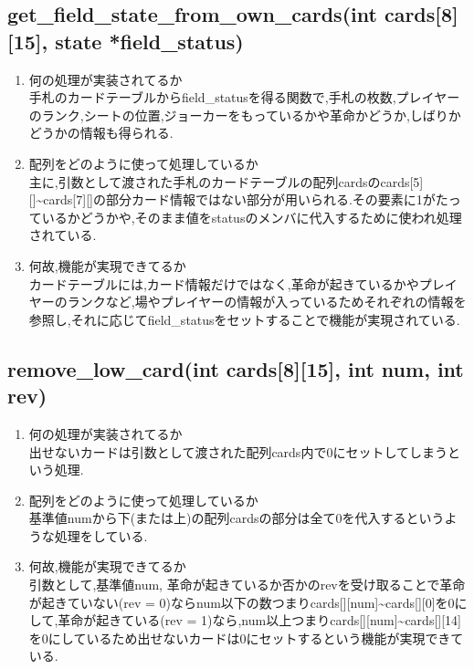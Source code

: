 \documentclass{jsarticle}
\begin{document}
\subsection{get\_field\_state\_from\_own\_cards(int cards[8][15], state *field\_status)}
\begin{enumerate}
  \item  何の処理が実装されてるか\\
  手札のカードテーブルからfield\_statusを得る関数で,手札の枚数,プレイヤーのランク,シートの位置,ジョーカーをもっているかや革命かどうか,しばりかどうかの情報も得られる.
  \item 配列をどのように使って処理しているか\\
  主に,引数として渡された手札のカードテーブルの配列cardsのcards[5][]\textasciitilde  cards[7][]の部分カード情報ではない部分が用いられる.その要素に1がたっているかどうかや,そのまま値をstatusのメンバに代入するために使われ処理されている.
  \item 何故,機能が実現できてるか\\
  カードテーブルには,カード情報だけではなく,革命が起きているかやプレイヤーのランクなど,場やプレイヤーの情報が入っているためそれぞれの情報を参照し,それに応じてfield\_statusをセットすることで機能が実現されている.
\end{enumerate}


\subsection{remove\_low\_card(int cards[8][15], int num, int rev)}
\begin{enumerate}
  \item 何の処理が実装されてるか\\
  出せないカードは引数として渡された配列cards内で0にセットしてしまうという処理.
  \item 配列をどのように使って処理しているか\\
  基準値numから下(または上)の配列cardsの部分は全て0を代入するというような処理をしている.
  \item 何故,機能が実現できてるか\\
  引数として,基準値num, 革命が起きているか否かのrevを受け取ることで革命が起きていない(rev = 0)ならnum以下の数つまりcards[][num]\textasciitilde  cards[][0]を0にして,革命が起きている(rev = 1)なら,num以上つまりcards[][num]\textasciitilde  cards[][14]を0にしているため出せないカードは0にセットするという機能が実現できている.
\end{enumerate}
\end{document}
